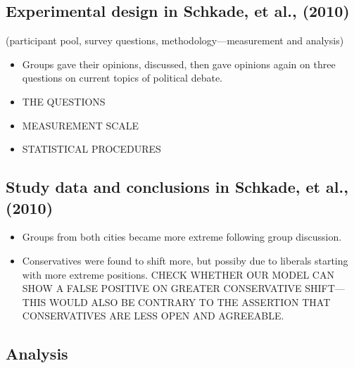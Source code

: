 \documentclass[11pt,letterpaper]{article}
\begin{document}
  \subsection{Experimental design in Schkade, et al., (2010)}
    (participant pool, survey questions,
    methodology---measurement and analysis)

    \begin{itemize}
      \item 
        Groups gave their opinions, discussed, then gave opinions again on
        three questions on current topics of political debate.
      \item
        THE QUESTIONS
      \item
        MEASUREMENT SCALE
      \item
        STATISTICAL PROCEDURES
    \end{itemize}
    \subsection{Study data and conclusions in Schkade, et al., (2010)}
    \begin{itemize}
      \item 
        Groups from both cities became more extreme following group discussion.
      \item
        Conservatives were found to shift more, but possiby due to liberals 
        starting with more extreme positions. CHECK WHETHER OUR MODEL CAN
        SHOW A FALSE POSITIVE ON GREATER CONSERVATIVE SHIFT---THIS WOULD ALSO BE
        CONTRARY TO THE ASSERTION THAT CONSERVATIVES ARE LESS OPEN AND AGREEABLE.
    \end{itemize}

\subsection{Analysis}
\end{document}

